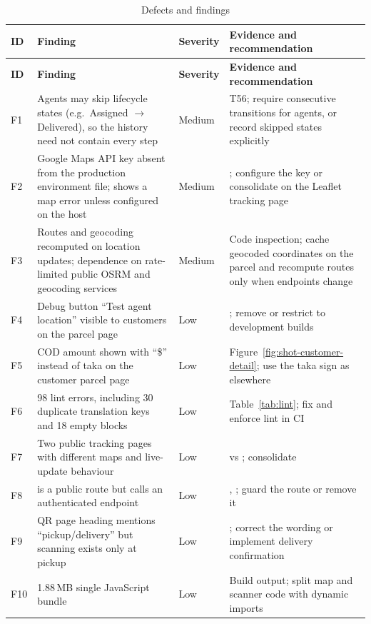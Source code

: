 \begin{longtable}{@{}P{0.7cm}P{5.6cm}P{1.7cm}P{5.4cm}@{}}
\caption{Defects and findings}\label{tab:defects}\\
\toprule
\textbf{ID} & \textbf{Finding} & \textbf{Severity} & \textbf{Evidence and recommendation} \\
\midrule
\endfirsthead
\toprule
\textbf{ID} & \textbf{Finding} & \textbf{Severity} & \textbf{Evidence and recommendation} \\
\midrule
\endhead
F1 & Agents may skip lifecycle states (e.g.\ Assigned $\rightarrow$ Delivered), so the history need not contain every step & Medium & T56; require consecutive transitions for agents, or record skipped states explicitly \\
F2 & Google Maps API key absent from the production environment file;  shows a map error unless configured on the host & Medium & ; configure the key or consolidate on the Leaflet tracking page \\
F3 & Routes and geocoding recomputed on location updates; dependence on rate-limited public OSRM and geocoding services & Medium & Code inspection; cache geocoded coordinates on the parcel and recompute routes only when endpoints change \\
F4 & Debug button ``Test agent location'' visible to customers on the parcel page & Low & ; remove or restrict to development builds \\
F5 & COD amount shown with ``\$'' instead of taka on the customer parcel page & Low & Figure~\ref{fig:shot-customer-detail}; use the taka sign as elsewhere \\
F6 & 98 lint errors, including 30 duplicate translation keys and 18 empty  blocks & Low & Table~\ref{tab:lint}; fix and enforce lint in CI \\
F7 & Two public tracking pages with different maps and live-update behaviour & Low &  vs ; consolidate \\
F8 &  is a public route but calls an authenticated endpoint & Low & , ; guard the route or remove it \\
F9 & QR page heading mentions ``pickup/delivery'' but scanning exists only at pickup & Low & ; correct the wording or implement delivery confirmation \\
F10 & 1.88\,MB single JavaScript bundle & Low & Build output; split map and scanner code with dynamic imports \\

\end{longtable}
